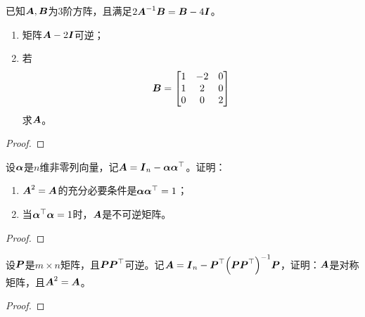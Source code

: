 \begin{problem}
已知\(\boldsymbol{A},\boldsymbol{B}\)为\(3\)阶方阵，且满足\(2{\boldsymbol{A}}^{-1}\boldsymbol{B}=\boldsymbol{B}-4\boldsymbol{I}\)。
\begin{enumerate}
    \item 矩阵\(\boldsymbol{A}-2\boldsymbol{I}\)可逆；
    \item 若
          \begin{equation*}
              \boldsymbol{B}=
              \begin{bmatrix}
                  1 & -2 & 0 \\
                  1 & 2  & 0 \\
                  0 & 0  & 2
              \end{bmatrix}
          \end{equation*}
          求\(\boldsymbol{A}\)。
\end{enumerate}
\end{problem}
\begin{proof}

\end{proof}

\begin{problem}
设\(\boldsymbol{\alpha}\)是\(n\)维非零列向量，记\(\boldsymbol{A}=\boldsymbol{I}_n-\boldsymbol{\alpha}\boldsymbol{\alpha}^\top\)。证明：
\begin{enumerate}
    \item \(\boldsymbol{A}^2=\boldsymbol{A}\)的充分必要条件是\(\boldsymbol{\alpha}\boldsymbol{\alpha}^\top=1\)；
    \item 当\(\boldsymbol{\alpha}^\top\boldsymbol{\alpha}=1\)时，\(\boldsymbol{A}\)是不可逆矩阵。
\end{enumerate}
\end{problem}
\begin{proof}

\end{proof}

\begin{problem}
设\(\boldsymbol{P}\)是\(m\times n\)矩阵，且\(\boldsymbol{P}\boldsymbol{P}^\top\)可逆。记\(\boldsymbol{A}=\boldsymbol{I}_n-\boldsymbol{P}^\top{\left( \boldsymbol{P}\boldsymbol{P}^\top \right)}^{-1}\boldsymbol{P}\)，证明：\(\boldsymbol{A}\)是对称矩阵，且\(\boldsymbol{A}^2=\boldsymbol{A}\)。
\end{problem}
\begin{proof}

\end{proof}

